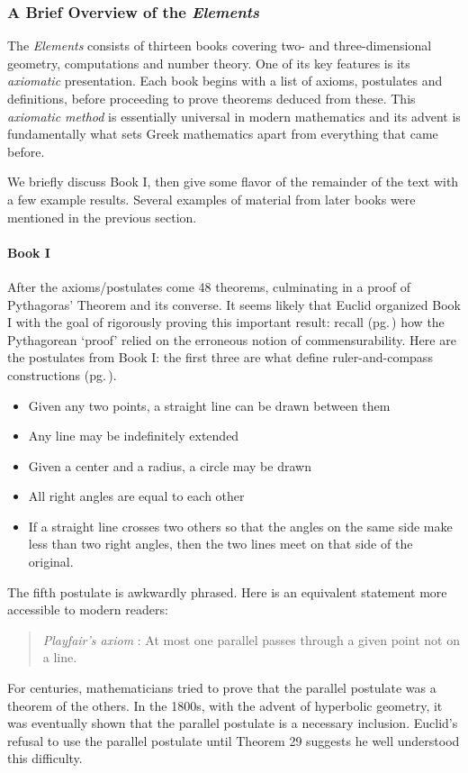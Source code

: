 \subsubsection*{A Brief Overview of the \emph{Elements}}

The \emph{Elements} consists of thirteen books covering two- and three-dimensional geometry, computations and number theory. One of its key features is its \emph{axiomatic} presentation. Each book begins with a list of axioms, postulates and definitions, before proceeding to prove theorems deduced from these. This \emph{axiomatic method} is essentially universal in modern mathematics and its advent is fundamentally what sets Greek mathematics apart from everything that came before.\smallbreak

We briefly discuss Book I, then give some flavor of the remainder of the text with a few example results. Several examples of material from later books were mentioned in the previous section.


\pagebreak[3]

\paragraph{Book I}

After the axioms/postulates come 48 theorems, culminating in a proof of Pythagoras' Theorem and its converse. It seems likely that Euclid organized Book I with the goal of rigorously proving this important result: recall (pg.\,\pageref{pthagorig}) how the Pythagorean `proof' relied on the erroneous notion of commensurability.\smallbreak
Here are the postulates from Book I: the first three are what define ruler-and-compass constructions (pg.\,\pageref{pg:construction}).

\begin{itemize}\itemsep2pt
  \item[P1] Given any two points, a straight line can be drawn between them
  \item[P2] Any line may be indefinitely extended
  \item[P3] Given a center and a radius, a circle may be drawn
  \item[P4] All right angles are equal to each other
  \item[P5] If a straight line crosses two others so that the angles on the same side make less than two right angles, then the two lines meet on that side of the original.
\end{itemize}

The fifth postulate is awkwardly phrased. Here is an equivalent statement more accessible to modern readers:
\begin{quote}
	\emph{Playfair's axiom} : At most one parallel passes through a given point not on a line.
\end{quote}
For centuries, mathematicians tried to prove that the parallel postulate was a theorem of the others. In the 1800s, with the advent of hyperbolic geometry, it was eventually shown that the parallel postulate is a necessary inclusion. Euclid's refusal to use the parallel postulate until Theorem 29 suggests he well understood this difficulty.\smallbreak


